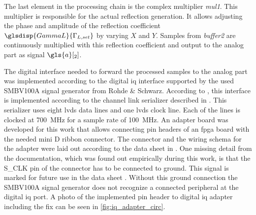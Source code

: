 \documentclass[12pt,a4paper,parskip=full,abstract=true,BCOR=12mm]{scrreprt}
\def\device#1{\mbox{\textit{#1}}}
\begin{document}
The last element in the processing chain is the complex multiplier \device{mul1}. This
multiplier is responsible for the actual reflection generation. It allows
adjusting the phase and amplitude of the reflection coefficient $\glsdisp{GammaL}{\Gamma_{L,set}}$ by
varying $X$ and $Y$. Samples from \device{buffer2} are continuously multiplied
with this reflection coefficient and output to the analog part as signal $\gls{a}[_2]$.

The digital interface needed to forward the processed samples to the analog part
was implemented according to the digital \gls{iq} interface supported by the used
SMBV100A signal generator from Rohde \& Schwarz. According to \cite{fsq_b17}, this interface is
implemented according to the channel link serializer described in \cite{ds90cr485}. This
serializer uses eight \gls{lvds} data lines and one \gls{lvds} clock line. Each of the lines
is clocked at \SI{700}{\mega\hertz} for a sample rate of \SI{100}{\mega\hertz}. An adapter
board was developed for this work that allows connecting pin headers of an \gls{fpga} board with
the needed mini D ribbon connector\cite{fsq_b17}. The connector and the wiring schema for the adapter
were laid out according to the data sheet in \cite{fsq_b17}. One missing detail from the documentation,
which was found out empirically during this work, is that the S\_CLK pin of the connector
has to be connected to ground. This signal is marked for future use in the data sheet \cite{fsq_b17}.
Without this ground connection the SMBV100A signal generator does not recognize a connected peripheral
at the digital \gls{iq} port. A photo of the implemented pin header to digital \gls{iq} adapter including
the fix can be seen in \cref{fig:iq_adapter_circ}.
\end{document}
